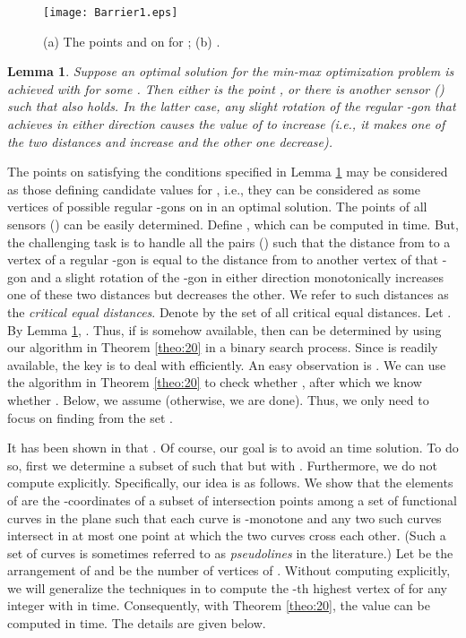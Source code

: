 \documentclass[11pt]{article}
\newtheorem{Lem}{Lemma}
\begin{document}
\begin{figure}[t]
\begin{center}
\texttt{[image: Barrier1.eps]}
\caption{(a) The points  and  on  for ;
(b) .}
\end{center}
\vspace*{-0.2in}
\end{figure}


\begin{Lem}\label{lem:10}\cite{ref:TanNe10}
Suppose an optimal solution for the min-max optimization problem is achieved
with  for some . Then either  is the point , or there is
another sensor  () such that  also holds. In the latter case, any slight rotation of the
regular -gon that achieves  in either direction
causes the value of  to increase (i.e., it makes one of the two
distances  and  increase and the other one decrease).
\end{Lem}

The points on  satisfying the conditions specified in
Lemma \ref{lem:10}
may be considered as those defining candidate values for ,
i.e., they can be considered as some vertices of possible regular
-gons on  in an optimal solution. The points 
of all sensors  () can be easily determined.
Define , which can be computed in
 time. But, the challenging task is to handle all the pairs
 () such that the distance from  to a
vertex of a regular -gon is equal to the distance from  to
another vertex of that -gon and a slight rotation of the -gon
in either direction monotonically increases one of these two
distances but decreases the other. We refer to such distances as the
{\it critical equal distances}. Denote by  the set of all critical equal
distances. Let . By Lemma \ref{lem:10}, . Thus, if  is somehow available, then  can be
determined by using our algorithm in Theorem \ref{theo:20} in a binary search process. Since
 is readily available, the key is to deal with 
efficiently. An easy observation is .
We can use the algorithm in Theorem \ref{theo:20} to check whether
, after which we know
whether . Below, we assume
 (otherwise, we are
done). Thus, we only need to focus on finding  from the set .




It has been shown in \cite{ref:TanNe10} that .
Of course, our goal is to avoid an  time solution.
To do so, first we determine a subset  of  such that
 but with .
Furthermore, we do not compute  explicitly. Specifically, our
idea is as follows. We show that the elements of  are the
-coordinates of a subset of intersection points among a set  of 
functional curves in the plane such that each curve is -monotone and any two
such curves intersect in at most one point at which the two curves cross
each other. (Such a set of curves is sometimes referred to as
{\em pseudolines} in the literature.) Let  be the arrangement
of  and  be the number of vertices of . Without
computing  explicitly, we will generalize the techniques in
\cite{ref:ColeAn89} to compute the -th highest vertex of
 for any integer  with  in
 time. Consequently, with Theorem \ref{theo:20}, the
value  can be computed in  time. The
details are given below.
\end{document}

